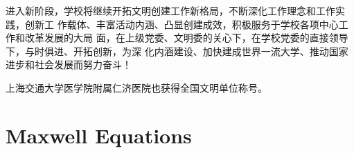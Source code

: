 \documentclass{sjtureport}
\begin{document}
进入新阶段，学校将继续开拓文明创建工作新格局，不断深化工作理念和工作实践，创新工
作载体、丰富活动内涵、凸显创建成效，积极服务于学校各项中心工作和改革发展的大局
面，在上级党委、文明委的关心下，在学校党委的直接领导下，与时俱进、开拓创新，为深
化内涵建设、加快建成世界一流大学、推动国家进步和社会发展而努力奋斗！

上海交通大学医学院附属仁济医院也获得全国文明单位称号。


\nocite{*}
\printbibliography[heading=bibintoc]

\appendix
\captionsetup{list=no} %

\chapter{Maxwell Equations}
\end{document}

